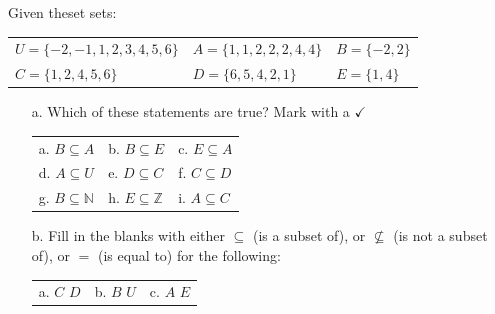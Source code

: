 \documentclass[a4paper,12pt]{book}
\newcounter{question}
\begin{document}
        \begin{questionNOGRADE}{\thequestion}

            Given theset sets:

            \begin{tabular}{l l l}
                $U = \{-2, -1, 1, 2, 3, 4, 5, 6\}$ &
                $A = \{1, 1, 2, 2, 2, 4, 4\}$ &
                $B = \{-2, 2\}$ \\
                $C = \{1, 2, 4, 5, 6\}$ &
                $D = \{6, 5, 4, 2, 1\}$ &
                $E = \{1, 4\}$
            \end{tabular}

            \begin{enumerate}
                \item[a.] Which of these statements are true? Mark with a $\checkmark$

                \begin{tabular}{l l l}
                    a. $B \subseteq A$      \solution{ \xmark }{ \fitb } &
                    b. $B \subseteq E$      \solution{ \xmark }{ \fitb } &
                    c. $E \subseteq A$      \solution{ \checkmark }{ \fitb }
                    \\
                    d. $A \subseteq U$      \solution{ \checkmark }{ \fitb } &
                    e. $D \subseteq C$      \solution{ \checkmark }{ \fitb } &
                    f. $C \subseteq D$      \solution{ \checkmark }{ \fitb }
                    \\
                    g. $B \subseteq \mathbb{N}$ \solution{ \xmark }{ \fitb } &
                    h. $E \subseteq \mathbb{Z}$ \solution{ \checkmark }{ \fitb } &
                    i. $A \subseteq C$      \solution{ \checkmark }{ \fitb }
                \end{tabular}

                \item[b.] Fill in the blanks with either
                    $\subseteq$ (is a subset of), or
                    $\not\subseteq$ (is not a subset of), or
                    $=$ (is equal to) for the following:

                \begin{tabular}{l l l}
                    a. $C$ \solution{ = }{\fitb} $D$ &
                    b. $B$ \solution{ $\subseteq$ }{\fitb} $U$ &
                    c. $A$ \solution{ $\not\subseteq$}{\fitb} $E$
                \end{tabular}
            \end{enumerate}

        \end{questionNOGRADE}
\end{document}

